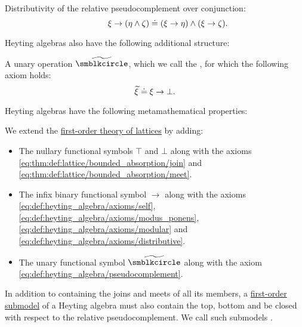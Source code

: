 \begin{definition}
\begin{thmenum}[series=def:heyting_algebra]
\begin{thmenum}
       Distributivity of the relative pseudocomplement over conjunction:
      \begin{equation}\label{eq:def:heyting_algebra/axioms/distributive}
        \mathllap{\xi \rightarrow (\eta \wedge \zeta)} \syneq \mathrlap{(\xi \rightarrow \eta) \wedge (\xi \rightarrow \zeta).}
      \end{equation}
    \end{thmenum}
  \end{thmenum}

  Heyting algebras also have the following additional structure:
  \begin{thmenum}[resume=def:heyting_algebra]
     A unary operation \( {\widetilde {\anon}} \), which we call the , for which the following axiom holds:
    \begin{equation}\label{eq:def:heyting_algebra/pseudocomplement}
      \widetilde \xi \doteq \xi \rightarrow \bot.
    \end{equation}
  \end{thmenum}

  Heyting algebras have the following metamathematical properties:
  \begin{thmenum}[resume=def:heyting_algebra]
     We extend the \hyperref[def:lattice/theory]{first-order theory of lattices} by adding:
    \begin{itemize}
      \item The nullary functional symbols \( \top \) and \( \bot \) along with the axioms \eqref{eq:thm:def:lattice/bounded_absorption/join} and \eqref{eq:thm:def:lattice/bounded_absorption/meet}.

      \item The infix binary functional symbol \( \rightarrow \) along with the axioms \eqref{eq:def:heyting_algebra/axioms/self}, \eqref{eq:def:heyting_algebra/axioms/modus_ponens}, \eqref{eq:def:heyting_algebra/axioms/modular} and \eqref{eq:def:heyting_algebra/axioms/distributive}.

      \item The unary functional symbol \( {\widetilde {\anon}} \) along with the axiom \eqref{eq:def:heyting_algebra/pseudocomplement}.
    \end{itemize}

     In addition to containing the joins and meets of all its members, a \hyperref[def:first_order_submodel]{first-order submodel} of a Heyting algebra must also contain the top, bottom and be closed with respect to the relative pseudocomplement. We call such submodels .


\end{thmenum}
\end{definition}
